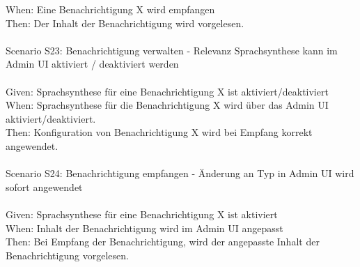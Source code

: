 \begin{tabbing}
    When:   \> \> \> Eine Benachrichtigung X wird empfangen \\
    Then:   \> \> \> Der Inhalt der Benachrichtigung wird vorgelesen. \\
    \\
    Scenario S23: \> \> \> Benachrichtigung verwalten - Relevanz Sprachsynthese kann im Admin UI aktiviert / deaktiviert werden \\ \\
    Given:  \> \> \> Sprachsynthese für eine Benachrichtigung X ist aktiviert/deaktiviert \\
    When:   \> \> \> Sprachsynthese für die Benachrichtigung X wird über das Admin UI aktiviert/deaktiviert. \\
    Then:   \> \> \> Konfiguration von Benachrichtigung X wird bei Empfang korrekt angewendet. \\
    \\
    Scenario S24: \> \> \> Benachrichtigung empfangen - Änderung an Typ in Admin UI wird sofort angewendet \\ \\
    Given:  \> \> \> Sprachsynthese für eine Benachrichtigung X ist aktiviert \\
    When:   \> \> \> Inhalt der Benachrichtigung wird im Admin UI angepasst\\
    Then:   \> \> \> Bei Empfang der Benachrichtigung, wird der angepasste Inhalt der Benachrichtigung vorgelesen.\\
    \\
\end{tabbing}
